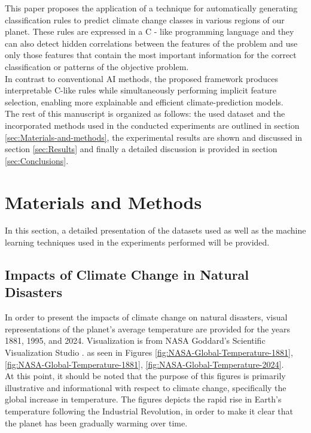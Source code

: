 \documentclass[12pt]{Definitions/academia}
\begin{document}
This paper proposes the application of a technique for automatically
generating classification rules to predict climate change classes
in various regions of our planet. These rules are expressed in a C
- like programming language and they can also detect hidden correlations
between the features of the problem and use only those features that
contain the most important information for the correct classification
or patterns of the objective problem. \\
In contrast to conventional
AI methods, the proposed framework produces interpretable C\nobreakdash-like
rules while simultaneously performing implicit feature selection,
enabling more explainable and efficient climate\nobreakdash-prediction
models.\\
The rest of this manuscript is organized as follows: the used dataset
and the incorporated methods used in the conducted experiments are
outlined in section \ref{sec:Materials-and-methods}, the experimental
results are shown and discussed in section \ref{sec:Results} and finally a
detailed discussion is provided in section \ref{sec:Conclusions}.

\section{Materials and Methods\label{sec:Materials-and-methods}}

In this section, a detailed presentation of the datasets used as well
as the machine learning techniques used in the experiments performed
will be provided.

\subsection{\textmd{Impacts of Climate Change in Natural Disasters}}
In order to present the impacts of climate change on natural disasters,
visual representations of the planet\textquoteright s average temperature
are provided for the years 1881, 1995, and 2024. Visualization is
from NASA Goddard's Scientific Visualization Studio \cite{NASA 2024}. 
as seen in Figures
\ref{fig:NASA-Global-Temperature-1881}, \ref{fig:NASA-Global-Temperature-1881}, \ref{fig:NASA-Global-Temperature-2024}.\\
{At this point, it should be noted that the purpose of this figures is primarily illustrative and informational with respect to climate change, specifically the global increase in temperature. The figures depicts the rapid rise in Earth's temperature following the Industrial Revolution, in order to make it clear that the planet has been gradually warming over time.}\clearpage
\end{document}
